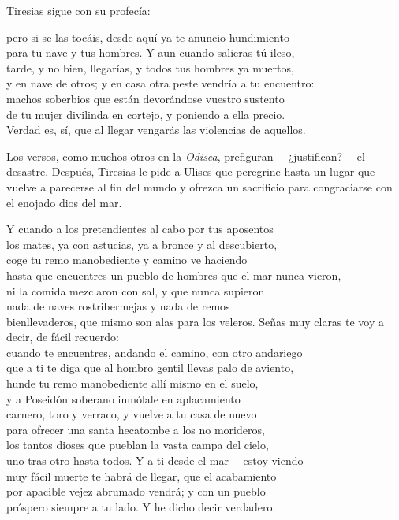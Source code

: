 Tiresias sigue con su profecía:

\begin{versocita}
pero si se las tocáis, desde aquí ya te anuncio hundimiento\\
para tu nave y tus hombres. Y aun cuando salieras tú ileso,\\
tarde, y no bien, llegarías, y todos tus hombres ya muertos,\\
y en nave de otros; y en casa otra peste vendría a tu encuentro:\\
machos soberbios que están devorándose vuestro sustento\\
de tu mujer divilinda en cortejo, y poniendo a ella precio.\\
Verdad es, sí, que al llegar vengarás las violencias de aquellos.
\end{versocita}

Los versos, como muchos otros en la \emph{Odisea}, prefiguran ---¿justifican?--- el desastre. Después, Tiresias le pide a Ulises que peregrine hasta un lugar que vuelve a parecerse al fin del mundo y ofrezca un sacrificio para congraciarse con el enojado dios del mar.

\begin{versocita}
Y cuando a los pretendientes al cabo por tus aposentos\\
los mates, ya con astucias, ya a bronce y al descubierto,\\
coge tu remo manobediente y camino ve haciendo\\
hasta que encuentres un pueblo de hombres que el mar nunca vieron,\\
ni la comida mezclaron con sal, y que nunca supieron\\
nada de naves rostribermejas y nada de remos\\
bienllevaderos, que mismo son alas para los veleros.
\stanzabreak
Señas muy claras te voy a decir, de fácil recuerdo:\\
cuando te encuentres, andando el camino, con otro andariego\\
que a ti te diga que al hombro gentil llevas palo de aviento,\\
hunde tu remo manobediente allí mismo en el suelo,\\
y a Poseidón soberano inmólale en aplacamiento\\
carnero, toro y verraco, y vuelve a tu casa de nuevo\\
para ofrecer una santa hecatombe a los no morideros,\\
los tantos dioses que pueblan la vasta campa del cielo,\\
uno tras otro hasta todos. Y a ti desde el mar ---estoy viendo---\\
muy fácil muerte te habrá de llegar, que el acabamiento\\
por apacible vejez abrumado vendrá; y con un pueblo\\
próspero siempre a tu lado. Y he dicho decir verdadero.
\end{versocita}

